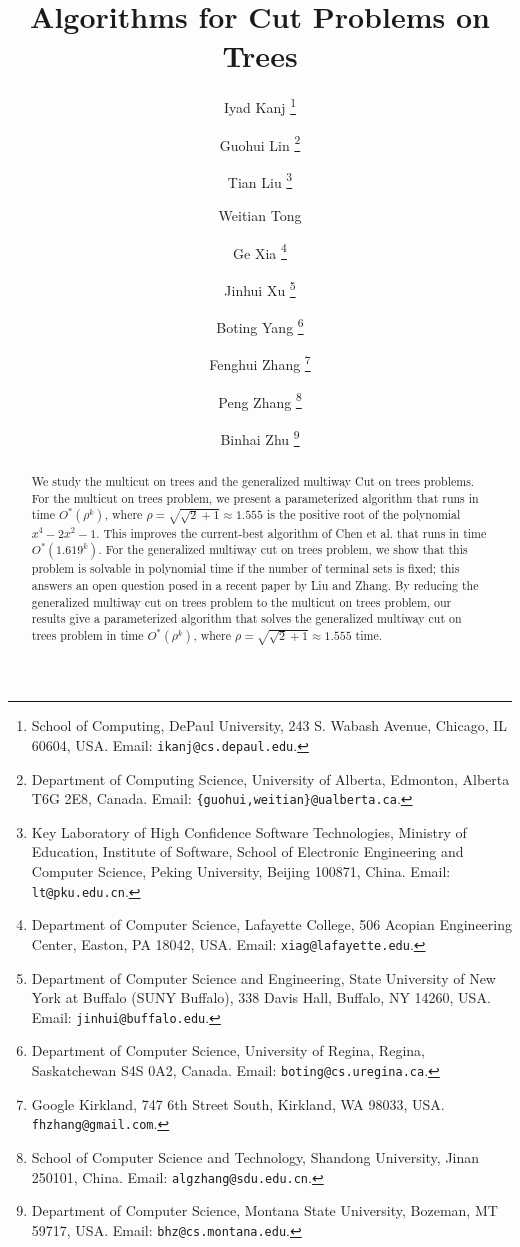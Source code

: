 \documentclass[11pt]{article}
\begin{document}
\title{Algorithms for Cut Problems on Trees}

\author{
  Iyad Kanj
    \thanks{School of  Computing, DePaul University,
        243 S. Wabash Avenue, Chicago, IL 60604, USA.
        Email: \texttt{ikanj@cs.depaul.edu}.}
  \and
  Guohui Lin
    \thanks{Department of Computing Science, University of Alberta,
        Edmonton, Alberta T6G 2E8, Canada.
        Email: \texttt{\{guohui,weitian\}@ualberta.ca}.}
  \and
  Tian Liu
    \thanks{Key Laboratory of High Confidence Software Technologies, Ministry of Education,
        Institute of Software, School of Electronic Engineering and Computer Science,
        Peking University, Beijing 100871, China.
        Email: \texttt{lt@pku.edu.cn}.}
  \and
  Weitian Tong
  \footnotemark[2]
  \and
  Ge Xia
    \thanks{Department of Computer Science, Lafayette College,
        506 Acopian Engineering Center, Easton, PA 18042, USA.
        Email: \texttt{xiag@lafayette.edu}.}
  \and
  Jinhui Xu
    \thanks{Department of Computer Science and Engineering,
        State University of New York at Buffalo (SUNY Buffalo),
        338 Davis Hall, Buffalo, NY 14260, USA.
        Email: \texttt{jinhui@buffalo.edu}.}
  \and
  Boting Yang
    \thanks{Department of Computer Science, University of Regina,
        Regina, Saskatchewan S4S 0A2, Canada.
        Email: \texttt{boting@cs.uregina.ca}.}
   \and
  Fenghui Zhang
    \thanks{Google
	Kirkland, 747 6th Street South,
	Kirkland, WA 98033, USA.
	\texttt{fhzhang@gmail.com}.}
  \and
  Peng Zhang
    \thanks{School of Computer Science and Technology, Shandong University,
        Jinan 250101, China.
        Email: \texttt{algzhang@sdu.edu.cn}.}
  \and
  Binhai Zhu
    \thanks{Department of Computer Science, Montana State University,
        Bozeman, MT 59717, USA.
        Email: \texttt{bhz@cs.montana.edu}.}
}
\date{}
\maketitle

\begin{abstract}
We study the {\sc multicut on trees} and the {\sc generalized multiway Cut on trees} problems. For the {\sc multicut on trees} problem, we present a parameterized algorithm that runs in time
$O^{*}(\rho^k)$, where $\rho = \sqrt{\sqrt{2} + 1} \approx 1.555$ is the positive root of the polynomial $x^4-2x^2-1$.
This improves the current-best algorithm of Chen et al. that runs in time $O^{*}(1.619^k)$. For the {\sc generalized multiway cut on trees} problem, we show that this problem is solvable in polynomial time if the number of terminal sets is fixed; this answers an open question posed in a recent paper by Liu and Zhang. By reducing the {\sc generalized multiway cut on trees} problem to the {\sc multicut on trees} problem, our results give a parameterized algorithm that solves the {\sc generalized multiway cut on trees} problem in time $O^{*}(\rho^k)$, where $\rho = \sqrt{\sqrt{2} + 1} \approx 1.555$ time.
\end{abstract}
\end{document}
